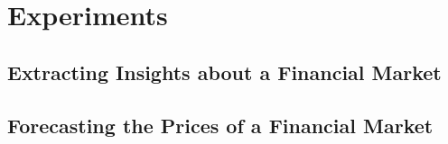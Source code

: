 \chapter{Experiments}
\label{chapter:experiments}

\section{Extracting Insights about a Financial Market}
\label{section:extracting-insights-about-a-financial-market}

\section{Forecasting the Prices of a Financial Market}
\label{section:forecasting-the-prices-of-a-financial-market}
